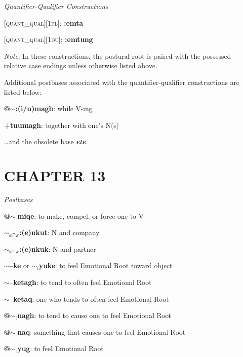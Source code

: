 \documentclass{article}
\begin{document}
\bigskip

\textit{Quantifier-Qualifier Constructions}

\textsc{[quant\_qual][1pl]}: \textbf{:emta}

\textsc{[quant\_qual][1du]}: \textbf{:emtung}

\bigskip

\textit{Note}: In these constructions, the postural root is paired with the possessed relative case endings unless otherwise listed above.

\bigskip

Additional postbases associated with the quantifier-qualifier constructions are listed below:
\begin{description}
\item \textbf{@$\sim$:(i/u)magh}: while V-ing
\item \textbf{+tuumagh}: together with one's N(s)
\end{description}

\bigskip

\ldots and the obsolete base \textit{\textbf{ete}}.

\section*{CHAPTER 13}

\textit{Postbases}
\begin{description}
\item \textbf{@$\sim_\text{f}$miqe}: to make, compel, or force one to V
\item \textbf{$\sim_\text{sf}\text{-}_\text{w}$:(e)nkut}: N and company
\item \textbf{$\sim_\text{sf}\text{-}_\text{w}$:(e)nkuk}: N and partner
\item \textbf{$\sim$--ke} or \textbf{$\sim_\text{f}$yuke}: to feel Emotional Root toward object
\item \textbf{$\sim$--ketagh}: to tend to often feel Emotional Root
\item \textbf{$\sim$--ketaq}: one who tends to often feel Emotional Root
\item \textbf{@$\sim_\text{f}$nagh}: to tend to cause one to feel Emotional Root
\item \textbf{@$\sim_\text{f}$naq}: something that causes one to feel Emotional Root
\item \textbf{@$\sim_\text{f}$yug}: to feel Emotional Root
\end{description}
\end{document}
